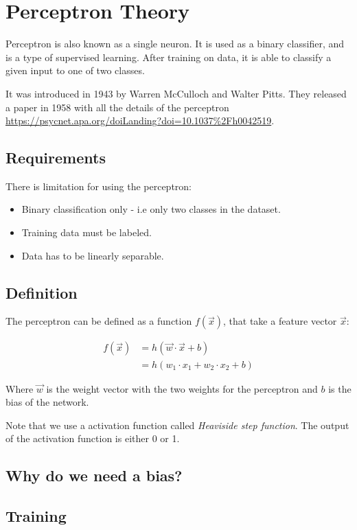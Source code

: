 \documentclass{article}
\begin{document}
    \section{Perceptron Theory}

    Perceptron is also known as a single neuron. 
    It is used as a binary classifier, and is a type of supervised learning. After training on data, it is able to classify a given input to one of two classes. 

    It was introduced in 1943 by Warren McCulloch and Walter Pitts.
    They released a paper in 1958 with all the details of the perceptron \url{https://psycnet.apa.org/doiLanding?doi=10.1037%2Fh0042519}.
    

    \subsection{Requirements}

    There is limitation for using the perceptron:

    \begin{itemize}
        \item Binary classification only - i.e only two classes in the dataset.
        \item Training data must be labeled.
        \item Data has to be linearly separable.
    \end{itemize}

    \subsection{Definition}

    The perceptron can be defined as a function $f(\vec{x})$, that take a feature vector $\vec{x}$:

    \begin{align}
        f(\vec{x}) &= h(\vec{w} \cdot \vec{x} + b) \\
                   &= h(w_1 \cdot x_1 + w_2 \cdot x_2 + b)
    \end{align}

    Where $\vec{w}$ is the weight vector with the two weights for the perceptron and $b$ is the bias of the network.
    
    Note that we use a activation function called \textit{Heaviside step function}. 
    The output of the activation function is either 0 or 1. 

    \subsection{Why do we need a bias?}



    \subsection{Training}

    
\end{document}
